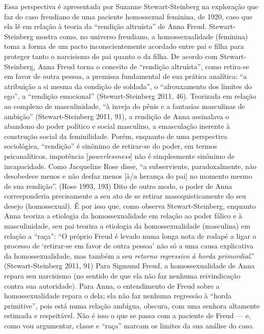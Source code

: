 Essa perspectiva é apresentada por Suzanne Stewart-Steinberg na
exploração que faz do caso freudiano de uma paciente homossexual
feminina, de 1920, caso que ela lê em relação à teoria da ``rendição
altruísta'' de Anna Freud. Stewart-Steinberg mostra como, no universo
freudiano, a homossexualidade (feminina) toma a forma de um pacto
inconscientemente acordado entre pai e filha para proteger tanto o
narcisismo do pai quanto o da filha. De acordo com Stewart-Steinberg,
Anna Freud torna o conceito de ``rendição altruísta'', como retira-se em
favor de outra pessoa, a premissa fundamental de sua prática analítica:
``a atribuição a si mesma da condição de soldada'', o ``afrouxamento dos
limites do ego'', a ``rendição emocional'' (Stewart-Steinberg 2011, 46).
Teorizada em relação ao complexo de masculinidade, ``à inveja do pênis e
a fantasias masculinas de ambição'' (Stewart-Steinberg 2011, 91), a
rendição de Anna assinalava o abandono do poder político e social
masculino, a emasculação inerente à construção social da feminilidade.
Porém, enquanto de uma perspectiva sociológica, ``rendição'' é sinônimo de
retirar-se do poder, em termos psicanalíticos, impotência
{[}\emph{powerlessness}{]} não é simplesmente sinônimo de incapacidade.
Como Jacqueline Rose disse, ``a subserviente, paradoxalmente, não
desobedece menos e não desfaz menos {[}à/a herança do pai{]} no momento
mesmo de sua rendição''. (Rose 1993, 193) Dito de outro modo, o poder de
Anna corresponderia precisamente a seu ato de se retirar
masoquisticamente do seu desejo (homossexual). É por isso que, como
observa Stewart-Steinberg, enquanto Anna teoriza a etiologia da
homossexualidade em relação ao poder fálico e à masculinidade, seu pai
teoriza a etiologia da homossexualidade (masculina) em relação a ``raça'':
``O próprio Freud é levado numa longa nota de rodapé a ligar o processo
de `retirar-se em favor de outra pessoa' não só a uma causa explicativa
da homossexualidade, mas também a seu \emph{retorno regressivo à horda
primordial}.'' (Stewart-Steinberg 2011, 91) Para Sigmund Freud, a
homossexualidade de Anna repara seu narcisismo (no sentido de que ela
não faz nenhuma reivindicação contra sua autoridade). Para Anna, o
entendimento de Freud sobre a homossexualidade repara o dela; ela não
faz nenhuma regressão à ``horda primitive'', pois está numa relação
ambígua, obscura, com uma senhora altamente estimada e respeitável. Não
é isso o que se passa com a paciente de Freud --- e, como vou argumentar,
classe e ``raça'' marcam os limites da sua análise do caso.

